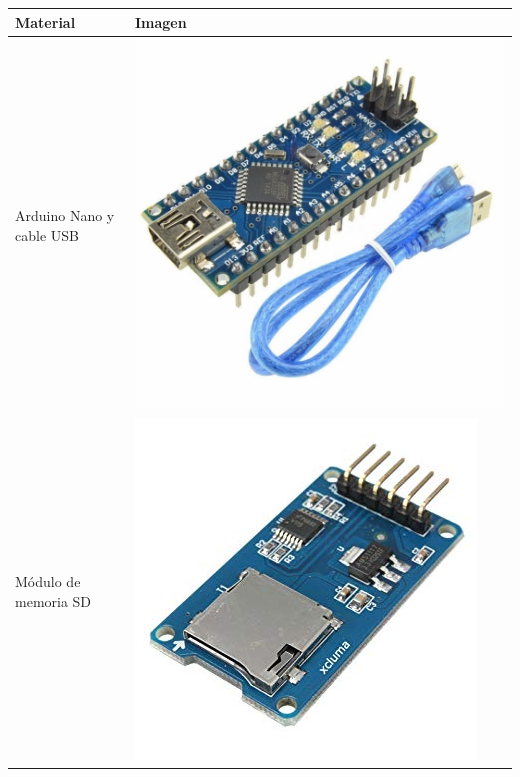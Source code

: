 \documentclass[11pt,twocolumn,letterpaper,spanish]{article}
\begin{document}
\begin{table}[hbt!]
  \centering
  \begin{tabular}{ m{6cm}  m{3.5cm} }
    \toprule
    Material  & Imagen \\
    \midrule
      Arduino Nano y cable USB & \includegraphics[align=t,scale=0.09]{Materiales/nano}\\
      \hline
      Módulo de memoria SD & \includegraphics[align=t,scale=0.16]{Materiales/sd}\\
      \hline

\end{tabular}
\end{table}
\end{document}
